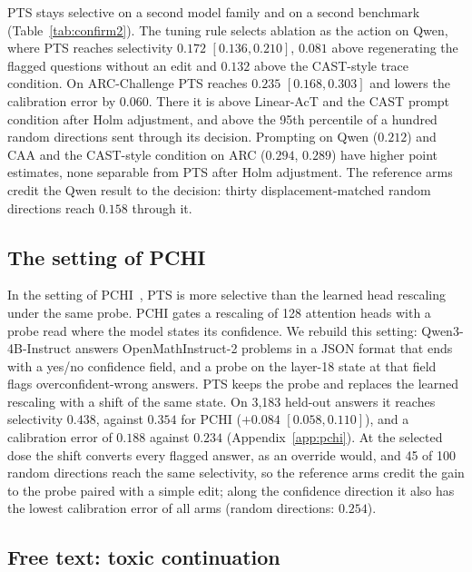 \documentclass{article}
\begin{document}
PTS stays selective on a second model family and on a second benchmark
(Table~\ref{tab:confirm2}). The tuning rule selects ablation as the action on
Qwen, where PTS reaches selectivity $0.172$ $[0.136, 0.210]$, $0.081$ above
regenerating the flagged questions without an edit and $0.132$ above the
CAST-style trace condition. On ARC-Challenge PTS reaches $0.235$
$[0.168, 0.303]$ and lowers the calibration error by $0.060$. There it is above
Linear-AcT and the CAST prompt condition after Holm adjustment, and above the
95th percentile of a hundred random directions sent through its decision.
Prompting on Qwen ($0.212$) and CAA and the CAST-style condition on ARC
($0.294$, $0.289$) have higher point estimates, none separable from PTS after
Holm adjustment. The reference arms credit the Qwen result to the decision:
thirty displacement-matched random directions reach $0.158$ through it.

\subsection{The setting of PCHI}

In the setting of PCHI~\citep{liu2026probe}, PTS is more selective than the
learned head rescaling under the same probe. PCHI gates a rescaling of 128
attention heads with a probe read where the model states its confidence. We
rebuild this setting: Qwen3-4B-Instruct answers OpenMathInstruct-2 problems in
a JSON format that ends with a yes/no confidence field, and a probe on the
layer-18 state at that field flags overconfident-wrong answers. PTS keeps the
probe and replaces the learned rescaling with a shift of the same state. On
3{,}183 held-out answers it reaches selectivity $0.438$, against $0.354$ for
PCHI ($+0.084$ $[0.058, 0.110]$), and a calibration error of $0.188$ against
$0.234$ (Appendix~\ref{app:pchi}). At the selected dose the shift converts
every flagged answer, as an override would, and 45 of 100 random directions
reach the same selectivity, so the reference arms credit the gain to the probe
paired with a simple edit; along the confidence direction it also has the
lowest calibration error of all arms (random directions: $0.254$).

\subsection{Free text: toxic continuation}
\end{document}
